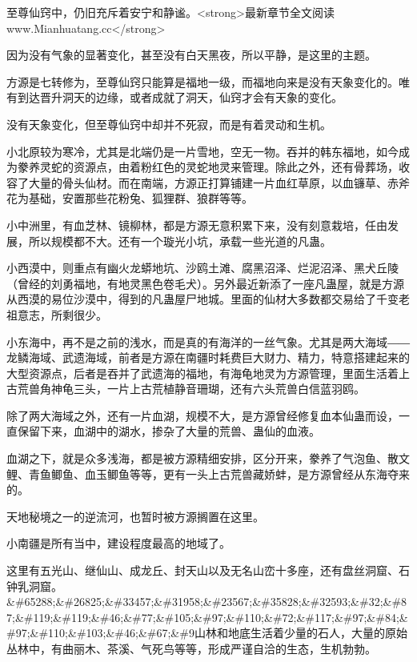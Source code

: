 
\begin{this_body}

至尊仙窍中，仍旧充斥着安宁和静谧。<strong>最新章节全文阅读www.Mianhuatang.cc</strong>

因为没有气象的显著变化，甚至没有白天黑夜，所以平静，是这里的主题。

方源是七转修为，至尊仙窍只能算是福地一级，而福地向来是没有天象变化的。唯有到达晋升洞天的边缘，或者成就了洞天，仙窍才会有天象的变化。

没有天象变化，但至尊仙窍中却并不死寂，而是有着灵动和生机。

小北原较为寒冷，尤其是北端仍是一片雪地，空无一物。吞并的韩东福地，如今成为豢养灵蛇的资源点，由着粉红色的灵蛇地灵来管理。除此之外，还有骨葬场，收容了大量的骨头仙材。而在南端，方源正打算铺建一片血红草原，以血镰草、赤斧花为基础，安置那些花粉兔、狐狸群、狼群等等。

小中洲里，有血芝林、镜柳林，都是方源无意积累下来，没有刻意栽培，任由发展，所以规模都不大。还有一个璇光小坑，承载一些光道的凡蛊。

小西漠中，则重点有幽火龙蟒地坑、沙鸥土滩、腐黑沼泽、烂泥沼泽、黑犬丘陵（曾经的刘勇福地，有地灵黑色卷毛犬）。另外最近新添了一座凡蛊屋，就是方源从西漠的易位沙漠中，得到的凡蛊屋尸地城。里面的仙材大多数都交易给了千变老祖意志，所剩很少。

小东海中，再不是之前的浅水，而是真的有海洋的一丝气象。尤其是两大海域――龙鳞海域、武遗海域，前者是方源在南疆时耗费巨大财力、精力，特意搭建起来的大型资源点，后者是吞并了武遗海的福地，有海龟地灵为方源管理，里面生活着上古荒兽角神龟三头，一片上古荒植静音珊瑚，还有六头荒兽白信蓝羽鸥。

除了两大海域之外，还有一片血湖，规模不大，是方源曾经修复血本仙蛊而设，一直保留下来，血湖中的湖水，掺杂了大量的荒兽、蛊仙的血液。

血湖之下，就是众多浅海，都是被方源精细安排，区分开来，豢养了气泡鱼、散文鲤、青鱼鲫鱼、血玉鲫鱼等等，更有一头上古荒兽藏娇蚌，是方源曾经从东海夺来的。

天地秘境之一的逆流河，也暂时被方源搁置在这里。

小南疆是所有当中，建设程度最高的地域了。

这里有五光山、继仙山、成龙丘、封天山以及无名山峦十多座，还有盘丝洞窟、石钟乳洞窟。\&\#65288;\&\#26825;\&\#33457;\&\#31958;\&\#23567;\&\#35828;\&\#32593;\&\#32;\&\#87;\&\#119;\&\#119;\&\#46;\&\#77;\&\#105;\&\#97;\&\#110;\&\#72;\&\#117;\&\#97;\&\#84;\&\#97;\&\#110;\&\#103;\&\#46;\&\#67;\&\#9山林和地底生活着少量的石人，大量的原始丛林中，有曲丽木、茶溪、气死鸟等等，形成严谨自洽的生态，生机勃勃。


\end{this_body}
